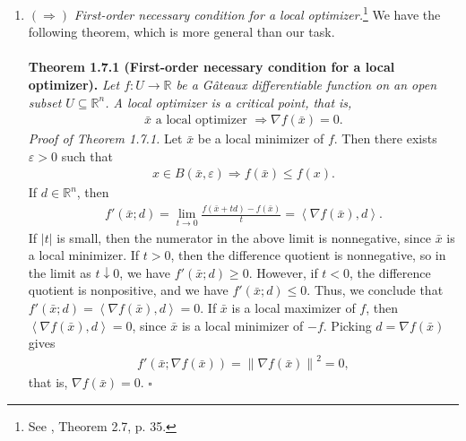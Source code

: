\documentclass[a4paper]{article}
\numberwithin{equation}{section}
\begin{document}
\begin{enumerate}
\item $\left(  \Rightarrow  \right)$ \textit{First-order necessary condition for a local optimizer.}\footnote{See \cite{1}, Theorem 2.7, p. 35.} We have the following theorem, which is more general than our task.\\
\\
\textbf{Theorem 1.7.1 (First-order necessary condition for a local optimizer).} \textit{Let $f:U\to \mathbb{R}$ be a G\^{a}teaux differentiable function on an open subset $U \subseteq \mathbb{R}^n$. A local optimizer is a critical point, that is,}
\begin{align}
\bar x \mbox{ a local optimizer } \Rightarrow \nabla f\left( \bar x \right) = 0.
\end{align}
\textit{Proof of Theorem 1.7.1.} Let $\bar x$ be a local minimizer of $f$. Then there exists $\varepsilon >0$ such that
\begin{align}
x \in B\left( {\bar x,\varepsilon } \right) \Rightarrow f\left( {\bar x} \right) \le f\left( x \right).
\end{align}
If $d\in \mathbb{R}^n$, then
\begin{align}
\label{1.49}
f'\left( {\bar x;d} \right) = \mathop {\lim }\limits_{t \to 0} \frac{{f\left( {\bar x + td} \right) - f\left( {\bar x} \right)}}{t} = \left\langle {\nabla f\left( {\bar x} \right),d} \right\rangle .
\end{align}
If $\left| t \right|$ is small, then the numerator in the above limit is nonnegative, since $\bar x$ is a local minimizer. If $t>0$, then the difference quotient is nonnegative, so in the limit as $t \downarrow 0$, we have $f'\left( {\bar x;d} \right) \ge 0$. However, if $t<0$, the difference quotient  is nonpositive, and we have $f'\left( {\bar x;d} \right) \le 0$. Thus, we conclude that $f'\left( {\bar x;d} \right) = \left\langle {\nabla f\left(\bar x \right),d} \right\rangle  = 0$. If $\bar x$ is a local maximizer of $f$, then $\left\langle {\nabla f\left( \bar x \right),d} \right\rangle  = 0$, since $\bar x$ is a local minimizer of $-f$. Picking $d = \nabla f\left( \bar x \right)$ gives 
\begin{align}
f'\left( {\bar x;\nabla f\left( {\bar x} \right)} \right) = {\left\| {\nabla f\left( {\bar x} \right)} \right\|^2} = 0,
\end{align}
that is, $\nabla f\left( {\bar x} \right) = 0$. \hfill $\square$


\end{enumerate}
\end{document}
